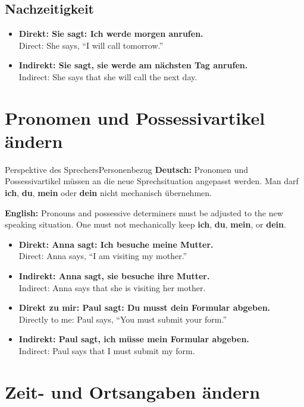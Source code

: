 \documentclass[a4paper,11pt]{article}
\newcommand{\GermanText}[1]{\textbf{Deutsch: }#1\par}
\newcommand{\EnglishText}[1]{{\small\color{SoftGray}\textbf{English: }#1\par}}
\newcommand{\ExampleItem}[2]{\item \textbf{#1}\\{\small\color{SoftGray}#2}}
\begin{document}
        \subsection{Nachzeitigkeit}

            \begin{exbox}
                \begin{itemize}
                    \ExampleItem{Direkt: Sie sagt: \glqq Ich werde morgen anrufen.\grqq}{Direct: She says, ``I will call tomorrow.''}
                    \ExampleItem{Indirekt: Sie sagt, sie werde am nächsten Tag anrufen.}{Indirect: She says that she will call the next day.}
                \end{itemize}
            \end{exbox}


    \section{Pronomen und Possessivartikel ändern}

        \begin{grammarentry}{Perspektive des Sprechers}{Personenbezug}
            \GermanText{Pronomen und Possessivartikel müssen an die neue Sprechsituation angepasst werden. Man darf \textbf{ich}, \textbf{du}, \textbf{mein} oder \textbf{dein} nicht mechanisch übernehmen.}
            \EnglishText{Pronouns and possessive determiners must be adjusted to the new speaking situation. One must not mechanically keep \textbf{ich}, \textbf{du}, \textbf{mein}, or \textbf{dein}.}
        \end{grammarentry}

        \begin{exbox}
            \begin{itemize}
                \ExampleItem{Direkt: Anna sagt: \glqq Ich besuche meine Mutter.\grqq}{Direct: Anna says, ``I am visiting my mother.''}
                \ExampleItem{Indirekt: Anna sagt, sie besuche ihre Mutter.}{Indirect: Anna says that she is visiting her mother.}
                \ExampleItem{Direkt zu mir: Paul sagt: \glqq Du musst dein Formular abgeben.\grqq}{Directly to me: Paul says, ``You must submit your form.''}
                \ExampleItem{Indirekt: Paul sagt, ich müsse mein Formular abgeben.}{Indirect: Paul says that I must submit my form.}
            \end{itemize}
        \end{exbox}


    \section{Zeit- und Ortsangaben ändern}
\end{document}
